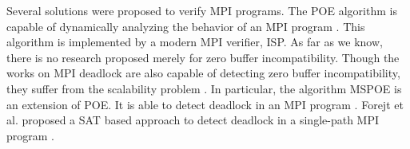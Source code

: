 Several solutions were proposed to verify MPI programs. The POE algorithm is capable of dynamically analyzing the behavior of an MPI program \cite{DBLP:conf/ppopp/VakkalankaSGK08}. This algorithm is implemented by a modern MPI verifier, ISP. As far as we know, there is no research proposed merely for zero buffer incompatibility. Though the works on MPI deadlock are also capable of detecting zero buffer incompatibility, they suffer from the scalability problem \cite{DBLP:conf/sbmf/SharmaGB12,DBLP:conf/fm/ForejtKNS14}. In particular, the algorithm MSPOE is an extension of POE. It is able to detect deadlock in an MPI program \cite{DBLP:conf/sbmf/SharmaGB12}. %
Forejt et al. proposed a SAT based approach to detect deadlock in a single-path MPI program \cite{DBLP:conf/fm/ForejtKNS14}. 








